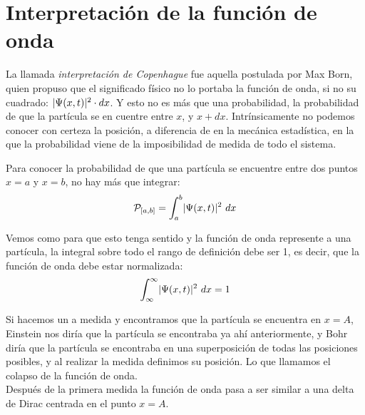 \documentclass{report}
\begin{document}
  \section{Interpretación de la función de onda}
    \noindent La llamada \textit{interpretación de Copenhague} fue aquella postulada por Max Born, 
    quien propuso que el significado físico no lo portaba la función de onda, si no su cuadrado: 
    $\lvert\Psi(x,t)\rvert^2\cdot dx$. Y esto no es más que una probabilidad, la probabilidad de que la 
    partícula se en cuentre entre $x$, y $x+dx$. Intrínsicamente no podemos conocer con certeza la 
    posición, a diferencia de en la mecánica estadística, en la que la probabilidad viene de la 
    imposibilidad de medida de todo el sistema. \\

    
\clearpage

    \noindent Para conocer la probabilidad de que una partícula se encuentre entre dos puntos $x=a$ 
    y $x=b$, no hay más que integrar: 
    \begin{equation}
      \mathcal{P}_{[a,b]}=\int_a^b\lvert\Psi(x,t)\rvert^2\ dx
      \label{eq:densidaddeprobabilidad}
    \end{equation}

    \noindent Vemos como para que esto tenga sentido y la función de onda represente a una partícula, 
    la integral sobre todo el rango de definición debe ser 1, es decir, que la función de onda debe 
    estar normalizada: 
    \begin{equation}
      \int_{\infty}^\infty\abs{\Psi(x,t)}^2\ dx=1
    \end{equation}

    \noindent Si hacemos un a medida y encontramos que la partícula se encuentra en $x=A$, Einstein
    nos diría que la partícula se encontraba ya ahí anteriormente, y Bohr diría que la partícula se
    encontraba en una superposición de todas las posiciones posibles, y al realizar la medida 
    definimos su posición. Lo que llamamos el colapso de la función de onda.\\

    \noindent Después de la primera medida la función de onda pasa a ser similar a una delta de Dirac
    centrada en el punto $x=A$.
\end{document}
